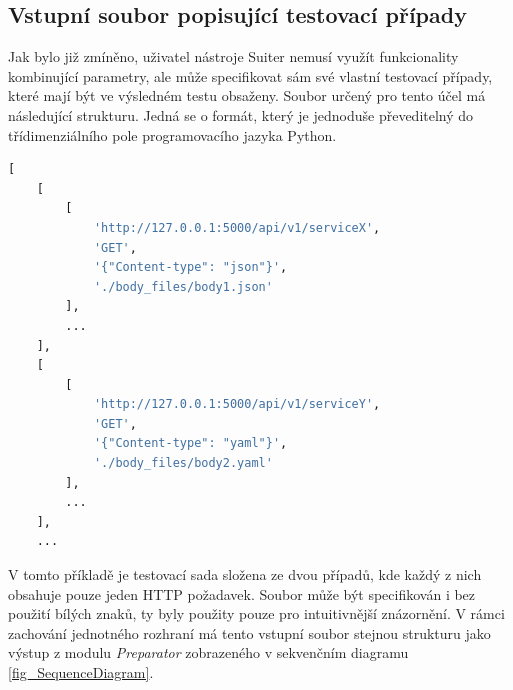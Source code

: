 

\subsection*{Vstupní soubor popisující testovací případy}
\label{subsec_VstupniSouborTestovaciPriday}

Jak bylo již zmíněno, uživatel nástroje Suiter nemusí využít funkcionality kombinující parametry, ale může specifikovat sám své vlastní testovací případy, které mají být ve výsledném testu obsaženy. Soubor určený pro tento účel má následující strukturu. Jedná se o formát, který je jednoduše převeditelný do třídimenziálního pole programovacího jazyka Python.

\begin{lstlisting}[language=Python, frame=single, basicstyle=\small]
[
	[
		[
			'http://127.0.0.1:5000/api/v1/serviceX', 
			'GET', 
			'{"Content-type": "json"}', 
			'./body_files/body1.json'
		],
		...
	],
	[
		[
			'http://127.0.0.1:5000/api/v1/serviceY', 
			'GET', 
			'{"Content-type": "yaml"}', 
			'./body_files/body2.yaml'
		],
		...
	],
	...
\end{lstlisting}

V tomto příkladě je testovací sada složena ze dvou případů, kde každý z nich obsahuje pouze jeden HTTP požadavek. Soubor může být specifikován i bez použití bílých znaků, ty byly použity pouze pro intuitivnější znázornění. V rámci zachování jednotného rozhraní má tento vstupní soubor stejnou strukturu jako výstup z modulu \textit{Preparator} zobrazeného v sekvenčním diagramu \ref{fig_SequenceDiagram}.



